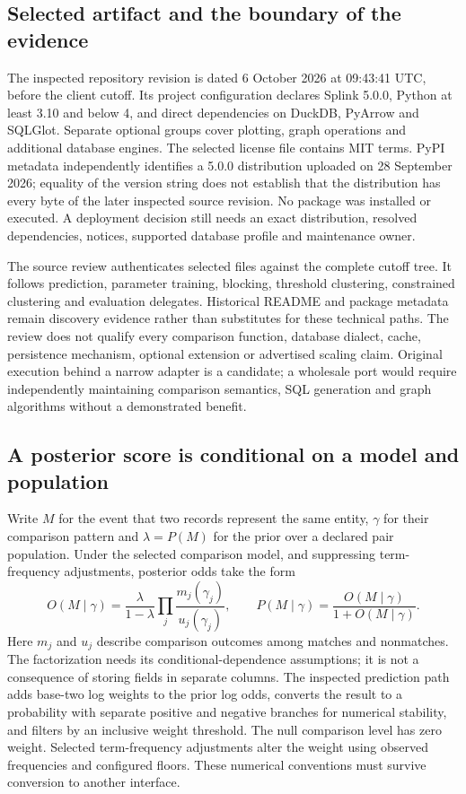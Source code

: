 \subsection{Selected artifact and the boundary of the evidence}
The inspected repository revision is dated 6 October 2026 at 09:43:41 UTC, before the client cutoff. Its project configuration declares Splink 5.0.0, Python at least 3.10 and below 4, and direct dependencies on DuckDB, PyArrow and SQLGlot. Separate optional groups cover plotting, graph operations and additional database engines. The selected license file contains MIT terms. PyPI metadata independently identifies a 5.0.0 distribution uploaded on 28 September 2026; equality of the version string does not establish that the distribution has every byte of the later inspected source revision. No package was installed or executed. A deployment decision still needs an exact distribution, resolved dependencies, notices, supported database profile and maintenance owner.~\citep{exec24_splink_sources}

The source review authenticates selected files against the complete cutoff tree. It follows prediction, parameter training, blocking, threshold clustering, constrained clustering and evaluation delegates. Historical README and package metadata remain discovery evidence rather than substitutes for these technical paths. The review does not qualify every comparison function, database dialect, cache, persistence mechanism, optional extension or advertised scaling claim. Original execution behind a narrow adapter is a candidate; a wholesale port would require independently maintaining comparison semantics, SQL generation and graph algorithms without a demonstrated benefit.~\citep{exec24_splink_sources,exec24_splink_contract}

\subsection{A posterior score is conditional on a model and population}
Write $M$ for the event that two records represent the same entity, $\gamma$ for their comparison pattern and $\lambda=P(M)$ for the prior over a declared pair population. Under the selected comparison model, and suppressing term-frequency adjustments, posterior odds take the form
\[
 O(M\mid\gamma)=\frac{\lambda}{1-\lambda}\prod_j\frac{m_j(\gamma_j)}{u_j(\gamma_j)},
 \qquad P(M\mid\gamma)=\frac{O(M\mid\gamma)}{1+O(M\mid\gamma)}.
\]
Here $m_j$ and $u_j$ describe comparison outcomes among matches and nonmatches. The factorization needs its conditional-dependence assumptions; it is not a consequence of storing fields in separate columns. The inspected prediction path adds base-two log weights to the prior log odds, converts the result to a probability with separate positive and negative branches for numerical stability, and filters by an inclusive weight threshold. The null comparison level has zero weight. Selected term-frequency adjustments alter the weight using observed frequencies and configured floors. These numerical conventions must survive conversion to another interface.~\citep{exec24_splink_sources}

